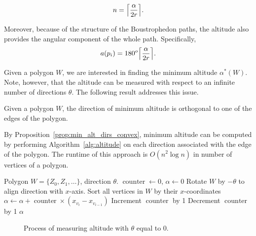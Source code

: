 \documentclass[../main.tex]{subfiles}
\begin{document}
\begin{equation}
	n=\ceil*{\frac{\alpha}{2r}}.
\end{equation}

Moreover, because of the structure of the Boustrophedon paths, the altitude also provides the angular component of the whole path. Specifically, 
\begin{equation}
	a(p_i)=180^o\ceil*{\frac{\alpha}{2r}}.
\end{equation}

Given a polygon $W$, we are interested in finding the minimum altitude $\alpha^*(W)$.  Note, however, that the altitude can be measured with respect to an infinite number of directions $\theta$. The following result addresses this issue.
\begin{proposition}
\label{prop:min_alt_dirs_convex}
Given a polygon $W$, the direction of minimum altitude is orthogonal to one of the edges of the polygon. 
\end{proposition}
By Proposition~\ref{prop:min_alt_dirs_convex}, minimum altitude can be computed by performing Algorithm~\ref{alg:altitude} on each direction associated with the edge of the polygon. The runtime of this approach is $O(n^2\log n)$ in number of vertices of a polygon.

\begin{algorithm}
	\caption{$\operatorname{get\_general\_altitude}(W, \theta)$}
	\label{alg:altitude}
	\begin{algorithmic}[1]
		\REQUIRE Polygon $W=\{Z_0, Z_1,\ldots\}$, direction $\theta$.
			\STATE $\operatorname{counter}\gets 0$, $\alpha\gets 0$
			\STATE Rotate $W$ by $-\theta$ to align direction with $x$-axis.
			\STATE Sort all vertices in $W$ by their  $x$-coordinates
				\STATE $\alpha\gets \alpha+\operatorname{counter}\times(x_{v_{i}}-x_{v_{i-1}})$ 
					\STATE Increment $\operatorname{counter}$ by 1
					\STATE Decrement $\operatorname{counter}$ by 1
				\ENDIF
			\ENDFOR
			\RETURN $\alpha$
	\end{algorithmic}
\end{algorithm}

\begin{figure}
	\centering
	
	\caption{Process of measuring altitude with $\theta$ equal to 0.}
	\label{fig:altitude}
\end{figure}
\end{document}
